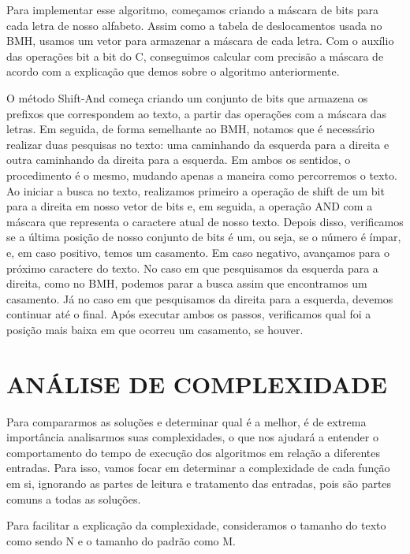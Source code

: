 \documentclass[12pt]{article}
\begin{document}
            Para implementar esse algoritmo, começamos criando a máscara de bits para cada letra de nosso alfabeto. Assim como a 
            tabela de deslocamentos usada no BMH, usamos um vetor para armazenar a máscara de cada letra. Com o auxílio das operações 
            bit a bit do C, conseguimos calcular com precisão a máscara de acordo com a explicação que demos sobre o algoritmo 
            anteriormente.
            
            O método Shift-And começa criando um conjunto de bits que armazena os prefixos que correspondem ao texto, a partir das 
            operações com a máscara das letras. Em seguida, de forma semelhante ao BMH, notamos que é necessário realizar duas pesquisas 
            no texto: uma caminhando da esquerda para a direita e outra caminhando da direita para a esquerda. Em ambos os sentidos, o 
            procedimento é o mesmo, mudando apenas a maneira como percorremos o texto. Ao iniciar a busca no texto, realizamos primeiro 
            a operação de shift de um bit para a direita em nosso vetor de bits e, em seguida, a operação AND com a máscara que 
            representa o caractere atual de nosso texto. Depois disso, verificamos se a última posição de nosso conjunto de bits é um, 
            ou seja, se o número é ímpar, e, em caso positivo, temos um casamento. Em caso negativo, avançamos para o próximo caractere 
            do texto. No caso em que pesquisamos da esquerda para a direita, como no BMH, podemos parar a busca assim que encontramos um 
            casamento. Já no caso em que pesquisamos da direita para a esquerda, devemos continuar até o final. Após executar ambos os 
            passos, verificamos qual foi a posição mais baixa em que ocorreu um casamento, se houver.

    \section{ANÁLISE DE COMPLEXIDADE}
        Para compararmos as soluções e determinar qual é a melhor, é de extrema importância analisarmos suas complexidades, o que nos 
        ajudará a entender o comportamento do tempo de execução dos algoritmos em relação a diferentes entradas. Para isso, vamos focar 
        em determinar a complexidade de cada função em si, ignorando as partes de leitura e tratamento das entradas, pois são partes 
        comuns a todas as soluções.

        Para facilitar a explicação da complexidade, consideramos o tamanho do texto como sendo N e o tamanho do padrão como M.
\end{document}

